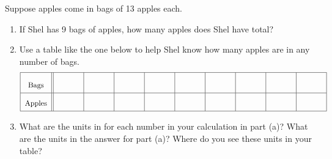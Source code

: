 \begin{prob}
Suppose apples come in bags of 13 apples each.  
\begin{enumerate}
\item If Shel has 9 bags of apples, how many apples does Shel have total?  
\item Use a table like the one below to help Shel know how many apples are in any number of bags.  
\[{\renewcommand{\arraystretch}{2}
\begin{tabular}{|c||c|c|c|c|c|c|c|c|c|}\hline
Bags  &  \rule[7mm]{10mm}{0mm} &\rule[7mm]{10mm}{0mm} & \rule[7mm]{10mm}{0mm} & \rule[7mm]{10mm}{0mm}  & \rule[7mm]{10mm}{0mm}
 & \rule[7mm]{10mm}{0mm} & \rule[7mm]{10mm}{0mm} & \rule[7mm]{10mm}{0mm} & \rule[7mm]{10mm}{0mm}   \\ \hline
Apples &  &  &  &  & & & & & \\ \hline
\end{tabular}}
\]
\item What are the units in for each number in your calculation in part (a)?  What are the units in the answer for part (a)?  Where do you see these units in your table?  
\end{enumerate}
\end{prob}
